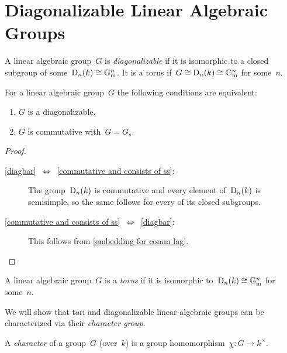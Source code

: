 \section{Diagonalizable Linear Algebraic Groups}


\begin{definition}
  A linear algebraic group~$G$ is \emph{diagonalizable} if it is isomorphic to a closed subgroup of some~$\operatorname{D}_n(k) \cong \mathbb{G}_{\text{m}}^n$.
  It is a torus if~$G \cong \operatorname{D}_n(k) \cong \mathbb{G}_{\text{m}}^n$ for some~$n$.
\end{definition}


\begin{lemma}
  For a linear algebraic group~$G$ the following conditions are equivalent:
  \begin{enumerate}
    \item
      \label{diagbar}
      $G$ is a diagonalizable.
    \item
      \label{commutative and consists of ss}
      $G$ is commutative with~$G = G_s$.
  \end{enumerate}
\end{lemma}


\begin{proof}
  \leavevmode
  \begin{description}
    \item[\ref*{diagbar}~$\iff$~\ref*{commutative and consists of ss}:]
      The group~$\operatorname{D}_n(k)$ is commutative and every element of~$\operatorname{D}_n(k)$ is semisimple, so the same follows for every of its closed subgroups.
    \item[\ref*{commutative and consists of ss}~$\iff$~\ref*{diagbar}:]
      This follows from \cref{embedding for comm lag}.
    \qedhere
  \end{description}
\end{proof}


\begin{definition}
  A linear algebraic group~$G$ is a \emph{torus} if it is isomorphic to~$\operatorname{D}_n(k) \cong \mathbb{G}_{\text{m}}^n$ for some~$n$.
\end{definition}


\begin{fluff}
  We will show that tori and diagonalizable linear algebraic groups can be characterized via their \emph{character group}.
\end{fluff}


\begin{definition}
  A \emph{character} of a group~$G$ (over~$k$) is a group homomorphism~$\chi \colon G \to k^\times$.
\end{definition}


